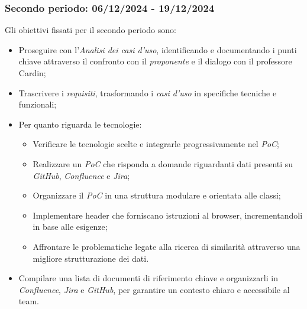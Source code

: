 \subsubsection{Secondo periodo: 06/12/2024 - 19/12/2024}
\label{sec:prev_cons_secondo_periodo}
Gli obiettivi fissati per il secondo periodo sono:
    \begin{itemize}
        \item Proseguire con l’\emph{Analisi dei casi d’uso}, identificando e documentando i punti chiave attraverso il confronto con il \emph{proponente} e il dialogo con il professore Cardin;
        \item Trascrivere i \emph{requisiti}, trasformando i \emph{casi d’uso} in specifiche tecniche e funzionali;
        \item Per quanto riguarda le tecnologie:
        \begin{itemize}
            \item Verificare le tecnologie scelte e integrarle progressivamente nel \emph{PoC};
            \item Realizzare un \emph{PoC} che risponda a domande riguardanti dati presenti su \emph{GitHub}, \emph{Confluence} e \emph{Jira};
            \item Organizzare il \emph{PoC} in una struttura modulare e orientata alle classi;
            \item Implementare header che forniscano istruzioni al browser, incrementandoli in base alle esigenze;
            \item Affrontare le problematiche legate alla ricerca di similarità attraverso una migliore strutturazione dei dati.
        \end{itemize}
        \item Compilare una lista di documenti di riferimento chiave e organizzarli in \emph{Confluence}, \emph{Jira} e \emph{GitHub}, per garantire un contesto chiaro e accessibile al team.
    \end{itemize}
    


